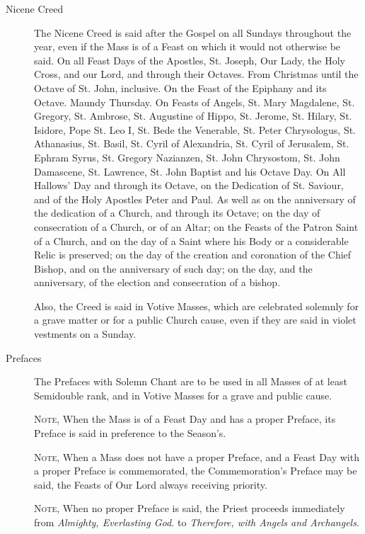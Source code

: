 \begin{description}
    \item[Nicene Creed] The Nicene Creed is said after the Gospel on all Sundays throughout the year, even if the Mass is of a Feast on which it would not otherwise be said. On all Feast Days of the Apostles, St. Joseph, Our Lady, the Holy Cross, and our Lord, and through their Octaves. From Christmas until the Octave of St. John, inclusive. On the Feast of the Epiphany and its Octave. Maundy Thursday. On Feasts of Angels, St. Mary Magdalene, St. Gregory, St. Ambrose, St. Augustine of Hippo, St. Jerome, St. Hilary, St. Isidore, Pope St. Leo I, St. Bede the Venerable, St. Peter Chrysologus, St. Athanasius, St. Basil, St. Cyril of Alexandria, St. Cyril of Jerusalem, St. Ephram Syrus, St. Gregory Nazianzen, St. John Chrysostom, St. John Damascene, St. Lawrence, St. John Baptist and his Octave Day. On All Hallows' Day and through its Octave, on the Dedication of St. Saviour, and of the Holy Apostles Peter and Paul. As well as on the anniversary of the dedication of a Church, and through its Octave; on the day of consecration of a Church, or of an Altar; on the Feasts of the Patron Saint of a Church, and on the day of a Saint where his Body or a considerable Relic is preserved; on the day of the creation and coronation of the Chief Bishop, and on the anniversary of such day; on the day, and the anniversary, of the election and consecration of a bishop.\par
    Also, the Creed is said in Votive Masses, which are celebrated solemnly for a grave matter or for a public Church cause, even if they are said in violet vestments on a Sunday.
    \item[Prefaces] The Prefaces with Solemn Chant are to be used in all Masses of at least Semidouble rank, and in Votive Masses for a grave and public cause.\par
    \textsc{Note,} When the Mass is of a Feast Day and has a proper Preface, its Preface is said in preference to the Season's.\par
    \textsc{Note,} When a Mass does not have a proper Preface, and a Feast Day with a proper Preface is commemorated, the Commemoration's Preface may be said, the Feasts of Our Lord always receiving priority.\par
    \textsc{Note,} When no proper Preface is said, the Priest proceeds immediately from \emph{Almighty, Everlasting God.} to \emph{Therefore, with Angels and Archangels}.

\end{description}
